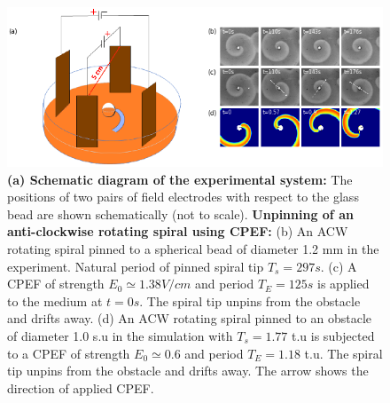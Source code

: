 \documentclass[%
 preprint,
 amsmath,amssymb,
 aps,
]{revtex4-2}
\begin{document}
\begin{figure}[H]
    \centering
    \includegraphics[scale=0.6]{Fig1.png}
    \caption{\textbf{(a) Schematic diagram of the experimental system:} The positions of two pairs of field electrodes with respect to the glass bead are shown schematically (not to scale).
    \textbf{Unpinning of an anti-clockwise rotating spiral using CPEF:}  (b) An ACW rotating spiral pinned to a spherical bead of diameter 1.2 mm in the experiment. Natural period of pinned spiral tip $T_{s} = 297 s$. (c) A CPEF of strength $E_0 \simeq 1.38 V/cm$ and period $T_{E} = 125 s$ is applied to the medium at $t=0s$. The spiral tip unpins from the obstacle and drifts away. 
    (d) An ACW rotating spiral pinned to an obstacle of diameter 1.0 s.u in the simulation with $T_{s} = 1.77$ t.u is subjected to a CPEF of strength $E_0 \simeq 0.6 $ and period $T_{E} =1.18$ t.u. The spiral tip unpins from the obstacle and drifts away.
    The arrow shows the direction of applied CPEF.}
    \label{fig:unpinning_images}
\end{figure}
 
\end{document}
